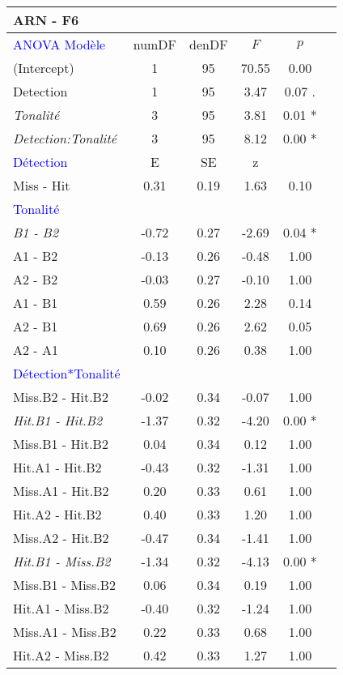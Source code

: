 \begin{landscape}
\begin{table}
\begin{multicols}{3}
\begin{tabular}{|l||*{5}{c|}}
\hline
\textbf{ARN - F6} & & & & \\
\hline
\textcolor{blue}{ANOVA Modèle} & numDF & denDF & $F$ & $p$ \\ 
\hline
(Intercept) & 1 & 95 & 70.55 & 0.00 \\ 
Detection & 1 & 95 & 3.47 & 0.07 .\\ 
\textit{Tonalité} & 3 & 95 & 3.81 & 0.01 * \\ 
\textit{Detection:Tonalité} & 3 & 95 & 8.12 & 0.00 * \\ 
\hline
\textcolor{blue}{Détection} & E & SE & z & \\ 
\hline
Miss - Hit & 0.31 & 0.19 & 1.63 & 0.10 \\ 
\hline
\textcolor{blue}{Tonalité} & & & & \\ 
\hline
\textit{B1 - B2} & -0.72 & 0.27 & -2.69 & 0.04 * \\ 
A1 - B2 & -0.13 & 0.26 & -0.48 & 1.00 \\ 
A2 - B2 & -0.03 & 0.27 & -0.10 & 1.00 \\ 
A1 - B1 & 0.59 & 0.26 & 2.28 & 0.14 \\ 
A2 - B1 & 0.69 & 0.26 & 2.62 & 0.05 \\ 
A2 - A1 & 0.10 & 0.26 & 0.38 & 1.00 \\ 
\hline
\textcolor{blue}{Détection*Tonalité} & & & & \\ 
\hline
Miss.B2 - Hit.B2 & -0.02 & 0.34 & -0.07 & 1.00 \\ 
\textit{Hit.B1 - Hit.B2} & -1.37 & 0.32 & -4.20 & 0.00 * \\ 
Miss.B1 - Hit.B2 & 0.04 & 0.34 & 0.12 & 1.00 \\ 
Hit.A1 - Hit.B2 & -0.43 & 0.32 & -1.31 & 1.00 \\ 
Miss.A1 - Hit.B2 & 0.20 & 0.33 & 0.61 & 1.00 \\ 
Hit.A2 - Hit.B2 & 0.40 & 0.33 & 1.20 & 1.00 \\ 
Miss.A2 - Hit.B2 & -0.47 & 0.34 & -1.41 & 1.00 \\ 
\textit{Hit.B1 - Miss.B2} & -1.34 & 0.32 & -4.13 & 0.00 * \\ 
Miss.B1 - Miss.B2 & 0.06 & 0.34 & 0.19 & 1.00 \\ 
Hit.A1 - Miss.B2 & -0.40 & 0.32 & -1.24 & 1.00 \\ 
Miss.A1 - Miss.B2 & 0.22 & 0.33 & 0.68 & 1.00 \\ 
Hit.A2 - Miss.B2 & 0.42 & 0.33 & 1.27 & 1.00 \\ 

\end{tabular}
\end{multicols}
\end{table}
\end{landscape}
